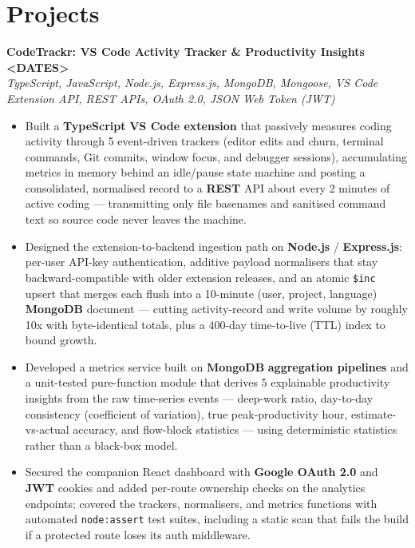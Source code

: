 \documentclass[11pt,a4paper]{article}
\newcommand{\project}[4]{%
  \textbf{#1} \hfill \textbf{#3}\\[1pt]
  \textit{#2}\\[-6pt]
  #4\vspace{4pt}
}
\begin{document}
\section*{Projects}

\project
  {CodeTrackr: VS Code Activity Tracker \& Productivity Insights}
  {TypeScript, JavaScript, Node.js, Express.js, MongoDB, Mongoose, VS Code
   Extension API, REST APIs, OAuth 2.0, JSON Web Token (JWT)}
  {<DATES>}
  {%
  \begin{itemize}
    \item Built a \textbf{TypeScript} \textbf{VS Code extension} that passively
          measures coding activity through 5 event-driven trackers (editor
          edits and churn, terminal commands, Git commits, window focus, and
          debugger sessions), accumulating metrics in memory behind an
          idle/pause state machine and posting a consolidated, normalised
          record to a \textbf{REST} API about every 2 minutes of active coding
          --- transmitting only file basenames and sanitised command text so
          source code never leaves the machine.
    \item Designed the extension-to-backend ingestion path on \textbf{Node.js}
          / \textbf{Express.js}: per-user API-key authentication, additive
          payload normalisers that stay backward-compatible with older
          extension releases, and an atomic \texttt{\$inc} upsert that merges
          each flush into a 10-minute (user, project, language) \textbf{MongoDB}
          document --- cutting activity-record and write volume by roughly 10x
          with byte-identical totals, plus a 400-day time-to-live (TTL) index
          to bound growth.
    \item Developed a metrics service built on \textbf{MongoDB} \textbf{aggregation
          pipelines} and a unit-tested pure-function module that derives 5
          explainable productivity insights from the raw time-series events ---
          deep-work ratio, day-to-day consistency (coefficient of variation),
          true peak-productivity hour, estimate-vs-actual accuracy, and
          flow-block statistics --- using deterministic statistics rather than
          a black-box model.
    \item Secured the companion React dashboard with \textbf{Google OAuth 2.0}
          and \textbf{JWT} cookies and added per-route ownership checks on the
          analytics endpoints; covered the trackers, normalisers, and metrics
          functions with automated \texttt{node:assert} test suites, including
          a static scan that fails the build if a protected route loses its
          auth middleware.
  \end{itemize}}
\end{document}
